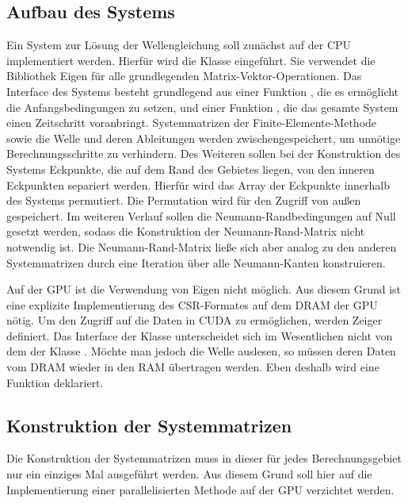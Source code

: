 \documentclass[crop=false,10pt,ngerman]{standalone}
\begin{document}
    \subsection{Aufbau des Systems} %
    \label{sub:aufbau_des_systems}
      Ein System zur Lösung der Wellengleichung soll zunächst auf der CPU implementiert werden.
      Hierfür wird die Klasse  eingeführt.
      Sie verwendet die Bibliothek Eigen für alle grundlegenden Matrix-Vektor-Operationen.
      Das Interface des Systems besteht grundlegend aus einer Funktion , die es ermöglicht die Anfangsbedingungen zu setzen, und einer Funktion , die das gesamte System einen Zeitschritt voranbringt.
      Systemmatrizen der Finite-Elemente-Methode sowie die Welle und deren Ableitungen werden zwischengespeichert, um unnötige Berechnungsschritte zu verhindern.
      Des Weiteren sollen bei der Konstruktion des Systems Eckpunkte, die auf dem Rand des Gebietes liegen, von den inneren Eckpunkten separiert werden.
      Hierfür wird das Array der Eckpunkte innerhalb des Systems permutiert.
      Die Permutation wird für den Zugriff von außen gespeichert.
      Im weiteren Verlauf sollen die Neumann-Randbedingungen auf Null gesetzt werden, sodass die Konstruktion der Neumann-Rand-Matrix nicht notwendig ist.
      Die Neumann-Rand-Matrix ließe sich aber analog zu den anderen Systemmatrizen durch eine Iteration über alle Neumann-Kanten konstruieren.

      Auf der GPU ist die Verwendung von Eigen nicht möglich.
      Aus diesem Grund ist eine explizite Implementierung des CSR-Formates auf dem DRAM der GPU nötig.
      Um den Zugriff auf die Daten in CUDA zu ermöglichen, werden Zeiger definiert.
      Das Interface der Klasse  unterscheidet sich im Wesentlichen nicht von dem der Klasse .
      Möchte man jedoch die Welle auslesen, so müssen deren Daten vom DRAM wieder in den RAM übertragen werden.
      Eben deshalb wird eine Funktion  deklariert.


    \subsection{Konstruktion der Systemmatrizen} %
    \label{sub:konstruktion_der_mass_und_stiffness_matrix}
      Die Konstruktion der Systemmatrizen muss in dieser für jedes Berechnungsgebiet nur ein einziges Mal ausgeführt werden.
      Aus diesem Grund soll hier auf die Implementierung einer parallelisierten Methode auf der GPU verzichtet werden.
\end{document}
